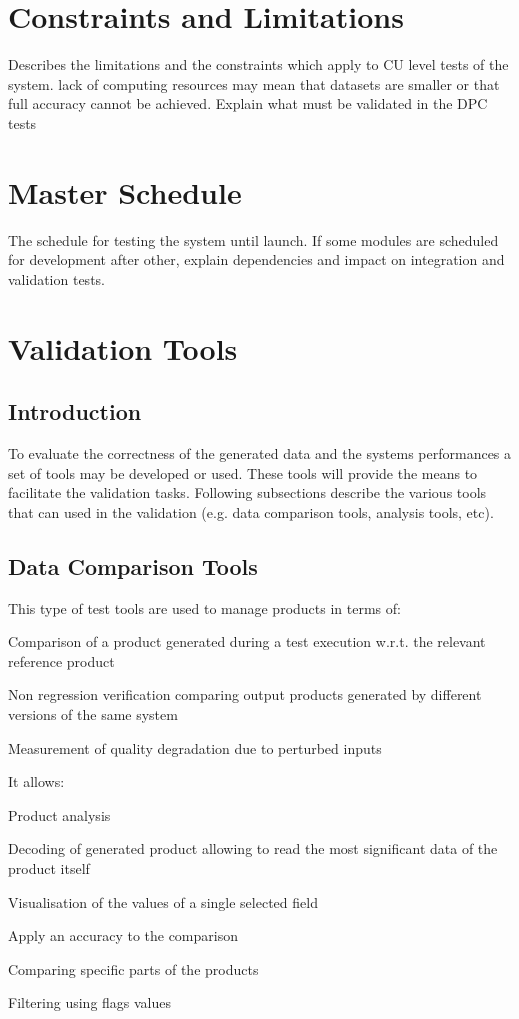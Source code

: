 \documentclass[CUx,lsstdraft,STP]{lsstdoc}
\begin{document}
\section{Constraints and Limitations}

Describes the limitations and the constraints which apply to CU level tests of the system. lack of computing resources may mean that datasets are smaller or that full accuracy cannot be achieved. Explain what must be validated in the DPC tests

\section{Master Schedule}

The schedule for testing the system until launch. If some modules are scheduled for development after other, explain dependencies and impact on integration and validation tests.

\section{Validation Tools}
\subsection{Introduction}

To evaluate the correctness of the generated data and the systems performances a set of tools may be developed or used. These
tools will provide the means to facilitate the validation tasks. 
Following subsections describe the various tools that can used in the \product validation (e.g. data comparison tools, analysis tools, etc).

\subsection{Data Comparison Tools}
This type of test tools are used to manage products in terms of:
\begin{itemize_single}
\item Comparison of a product generated during a test execution w.r.t. the relevant reference product
\item Non regression verification comparing output products generated by different versions of the same system
\item Measurement of quality degradation due to perturbed inputs
\end{itemize_single}
It allows:
\begin{itemize_single}
\item Product analysis
\item Decoding of generated product allowing to read the most significant data of the product itself
\item Visualisation of the values of a single selected field
\item Apply an accuracy to the comparison
\item Comparing specific parts of the products
\item Filtering using flags values
\end{itemize_single}
\end{document}
